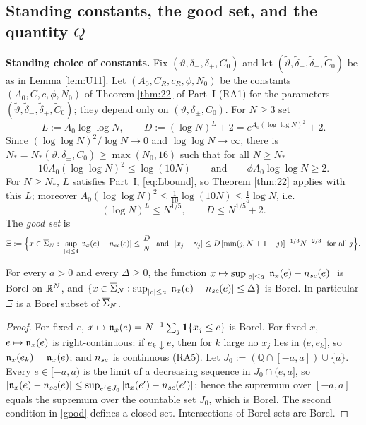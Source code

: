 \subsection{Standing constants, the good set, and the quantity $Q$}

\noindent\textbf{Standing choice of constants.} Fix $(\vartheta,\delta_-,\delta_+,C_0)$ and let $(\tilde\vartheta,\tilde\delta_-,\tilde\delta_+,\tilde C_0)$ be as in Lemma \ref{lem:U11}.
Let $(A_0,C_R,c_R,\phi,N_0)$ be the constants $(A_0,C,c,\phi,N_0)$ of Theorem \ref{thm:22} of Part~I (RA1) for the parameters $(\tilde\vartheta,\tilde\delta_-,\tilde\delta_+,\tilde C_0)$; they depend only on $(\vartheta,\delta_\pm,C_0)$. For $N\ge3$ set
\begin{equation}\label{defL}
L:=A_0\log\log N,\qquad D:=(\log N)^{L}+2=e^{A_0(\log\log N)^2}+2 .
\end{equation}
Since $(\log\log N)^2/\log N\to0$ and $\log\log N\to\infty$, there is $N_*=N_*(\vartheta,\delta_\pm,C_0)\ge\max(N_0,16)$ such that for all $N\ge N_*$
\begin{equation}\tag{N$_*$}\label{c2:Nstar}
10A_0(\log\log N)^2\le\log(10N)\qquad\text{and}\qquad\phi A_0\log\log N\ge2 .
\end{equation}
For $N\ge N_*$, $L$ satisfies Part~I, \eqref{eq:Lbound}, so Theorem \ref{thm:22} applies with this $L$; moreover $A_0(\log\log N)^2\le\frac1{10}\log(10N)\le\frac15\log N$, i.e.
\begin{equation}\tag{D$_*$}\label{c2:Dsmall}
(\log N)^L\le N^{1/5},\qquad D\le N^{1/5}+2 .
\end{equation}
The \emph{good set} is
\begin{equation}\label{good}
\Xi:=\Big\{x\in\cSig:\ \sup_{|e|\le4}|\fn_x(e)-\nsc(e)|\le\frac DN\ \text{ and }\ |x_j-\gamma_j|\le D\,[\min(j,N+1-j)]^{-1/3}N^{-2/3}\ \text{ for all }j\Big\}.
\end{equation}

\begin{auxlemma}[Measurability]\label{c2:Xi}
For every $a>0$ and every $\Delta\ge0$, the function $x\mapsto\sup_{|e|\le a}|\mathfrak{n}_x(e)-n_{sc}(e)|$ is Borel on $\mathbb{R}^N$, and $\{x\in\overline{\Sigma}_N:\sup_{|e|\le a}|\mathfrak{n}_x(e)-n_{sc}(e)|\le\Delta\}$ is Borel. In particular $\Xi$ is a Borel subset of $\overline{\Sigma}_N$.
\end{auxlemma}

\begin{proof}
For fixed $e$, $x\mapsto\mathfrak{n}_x(e)=N^{-1}\sum_j\mathbf 1\{x_j\le e\}$ is Borel. For fixed $x$, $e\mapsto\mathfrak{n}_x(e)$ is right-continuous: if $e_k\downarrow e$, then for $k$ large no $x_j$ lies in $(e,e_k]$, so $\mathfrak{n}_x(e_k)=\mathfrak{n}_x(e)$; and $n_{sc}$ is continuous (RA5).
Let $J_0:=(\mathbb Q\cap[-a,a])\cup\{a\}$. Every $e\in[-a,a)$ is the limit of a decreasing sequence in $J_0\cap(e,a]$, so $|\mathfrak{n}_x(e)-n_{sc}(e)|\le\sup_{e'\in J_0}|\mathfrak{n}_x(e')-n_{sc}(e')|$; hence the supremum over $[-a,a]$ equals the supremum over the countable set $J_0$, which is Borel.
The second condition in \eqref{good} defines a closed set. Intersections of Borel sets are Borel.
\end{proof}

